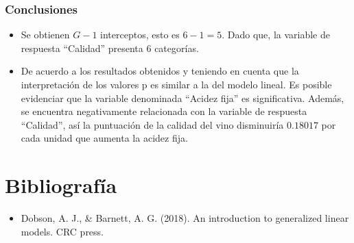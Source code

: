 \documentclass[
]{article}
\providecommand{\tightlist}{%
  \setlength{\itemsep}{0pt}\setlength{\parskip}{0pt}}
\begin{document}
\hypertarget{conclusiones}{%
\subsubsection{Conclusiones}\label{conclusiones}}

\begin{itemize}
\item
  Se obtienen \(G-1\) interceptos, esto es \(6-1=5\). Dado que, la
  variable de respuesta ``Calidad'' presenta 6 categorías.
\item
  De acuerdo a los resultados obtenidos y teniendo en cuenta que la
  interpretación de los valores p es similar a la del modelo lineal. Es
  posible evidenciar que la variable denominada ``Acidez fija'' es
  significativa. Además, se encuentra negativamente relacionada con la
  variable de respuesta ``Calidad'', así la puntuación de la calidad del
  vino disminuiría \(0.18017\) por cada unidad que aumenta la acidez
  fija.
\end{itemize}

\hypertarget{bibliografuxeda}{%
\section{Bibliografía}\label{bibliografuxeda}}

\begin{itemize}
\tightlist
\item
  Dobson, A. J., \& Barnett, A. G. (2018). An introduction to
  generalized linear models. CRC press.
\end{itemize}
\end{document}
